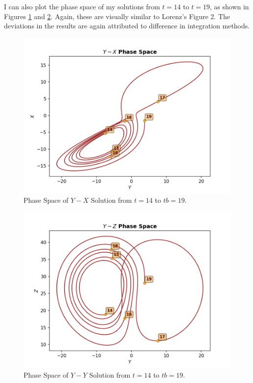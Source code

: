 \documentclass[linenumbers,trackchanges]{aastex7}
\begin{document}
I can also plot the phase space of my solutions from $t = 14$ to $t = 19$, as shown in Figures \ref{q3p4a} and \ref{q3p4b}. Again, these are visually similar to Lorenz's Figure 2. The deviations in the results are again attributed to difference in integration methods.
\begin{figure}[h!]
     \includegraphics{figures/q3p4a.png}
     \caption{Phase Space of $Y-X$ Solution from $t = 14$ to $tb = 19$.}
     \label{q3p4a}
\end{figure}
\begin{figure}[h!]
     \includegraphics{figures/q3p4b.png}
     \caption{Phase Space of $Y-Y$ Solution from $t = 14$ to $tb = 19$.}
     \label{q3p4b}
\end{figure}
\end{document}
